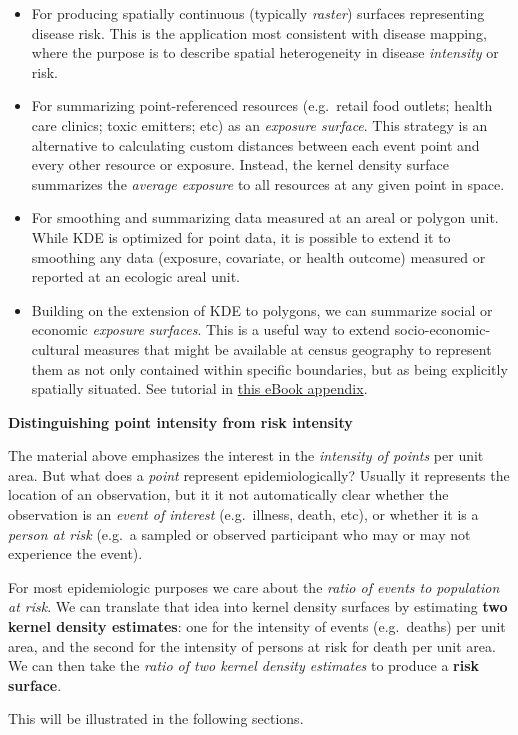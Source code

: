 \documentclass[
]{book}
\providecommand{\tightlist}{%
  \setlength{\itemsep}{0pt}\setlength{\parskip}{0pt}}
\newenvironment{rmdcaution}[1]
  {
  \begin{itemize}
  \renewcommand{\labelitemi}{
    \raisebox{-.7\height}[0pt][0pt]{
      {\setkeys{Gin}{width=3em,keepaspectratio}\texttt{[image: images/\#1]}}
    }
  }
  \setlength{\fboxsep}{1em}
  \begin{caution}
  \item
  }
  {
  \end{caution}
  \end{itemize}
  }
\begin{document}
\begin{itemize}
\tightlist
\item
  For producing spatially continuous (typically \emph{raster}) surfaces representing disease risk. This is the application most consistent with disease mapping, where the purpose is to describe spatial heterogeneity in disease \emph{intensity} or risk.
\item
  For summarizing point-referenced resources (e.g.~retail food outlets; health care clinics; toxic emitters; etc) as an \emph{exposure surface}. This strategy is an alternative to calculating custom distances between each event point and every other resource or exposure. Instead, the kernel density surface summarizes the \emph{average exposure} to all resources at any given point in space.
\item
  For smoothing and summarizing data measured at an areal or polygon unit. While KDE is optimized for point data, it is possible to extend it to smoothing any data (exposure, covariate, or health outcome) measured or reported at an ecologic areal unit.
\item
  Building on the extension of KDE to polygons, we can summarize social or economic \emph{exposure surfaces}. This is a useful way to extend socio-economic-cultural measures that might be available at census geography to represent them as not only contained within specific boundaries, but as being explicitly spatially situated. See tutorial in \protect\hyperlink{kde-extract}{this eBook appendix}.
\end{itemize}

\begin{rmdcaution}{caution}
\textbf{Distinguishing point intensity from risk intensity}

The material above emphasizes the interest in the \emph{intensity of points} per unit area. But what does a \emph{point} represent epidemiologically? Usually it represents the location of an observation, but it it not automatically clear whether the observation is an \emph{event of interest} (e.g.~illness, death, etc), or whether it is a \emph{person at risk} (e.g.~a sampled or observed participant who may or may not experience the event).

For most epidemiologic purposes we care about the \emph{ratio of events to population at risk}. We can translate that idea into kernel density surfaces by estimating \textbf{two kernel density estimates}: one for the intensity of events (e.g.~deaths) per unit area, and the second for the intensity of persons at risk for death per unit area. We can then take the \emph{ratio of two kernel density estimates} to produce a \textbf{risk surface}.

This will be illustrated in the following sections.

\end{rmdcaution}
\end{document}
